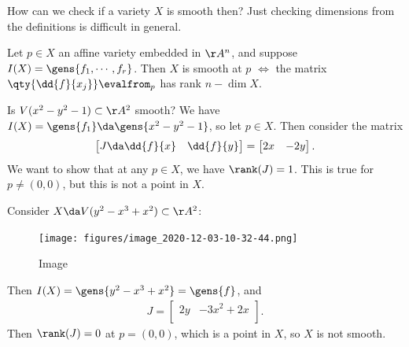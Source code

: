 \begin{remark}

How can we check if a variety \(X\) is smooth then? Just checking
dimensions from the definitions is difficult in general.

\end{remark}

\begin{proposition}

Let \(p\in X\) an affine variety embedded in \(\AA^n\), and suppose
\(I(X) = \gens{f_1, \cdots, f_r}\). Then \(X\) is smooth at \(p\)
\(\iff\) the matrix \(\qty{\dd{f}{x_j}}\evalfrom_{p}\) has rank
\(n - \dim X\).

\end{proposition}

\begin{example}[?]

Is \(V(x^2 - y^2 - 1) \subset \AA^2\) smooth? We have
\(I(X) = \gens{f_1} \da \gens{x^2 - y^2 - 1}\), so let \(p\in X\). Then
consider the matrix
\begin{align*}  
\begin{bmatrix}
J \da 
\dd{f}{x} & \dd{f}{y} \\
\end{bmatrix} = 
\begin{bmatrix}
2x & -2y \\
\end{bmatrix}
.\end{align*} We want to show that at any \(p\in X\), we have
\(\rank(J) = 1\). This is true for \(p\neq (0, 0)\), but this is not a
point in \(X\).

\end{example}

\begin{example}[?]

Consider \(X \da V(y^2 - x^3 + x^2) \subset \AA^2\):

\begin{figure}
\centering
\texttt{[image: figures/image\_2020-12-03-10-32-44.png]}
\caption{Image}
\end{figure}

Then \(I(X) = \gens{y^2 - x^3 + x^2} = \gens{f}\), and
\begin{align*}  
J = 
\begin{bmatrix}
2y & -3x^2 + 2x \\
\end{bmatrix}
.\end{align*} Then \(\rank(J) = 0\) at \(p = (0, 0)\), which is a point
in \(X\), so \(X\) is not smooth.

\end{example}

